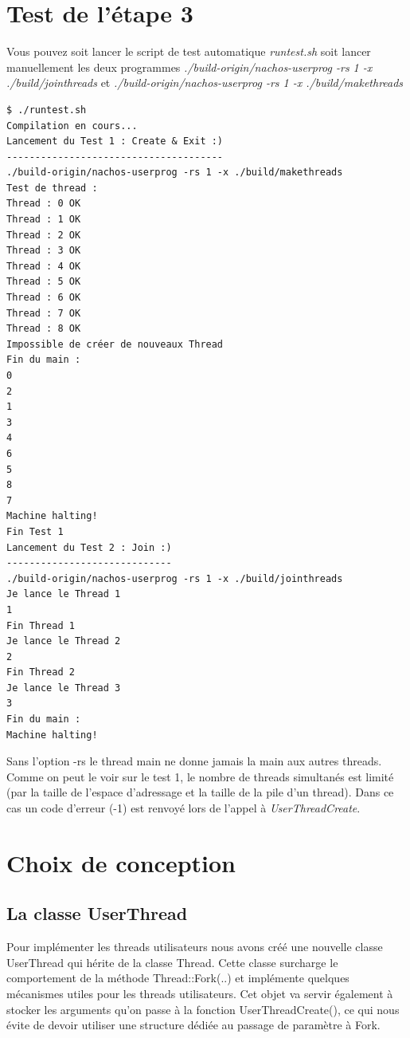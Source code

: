 \documentclass[a4paper,10pt]{article}
\begin{document}
\section{Test de l'étape 3}

Vous pouvez soit lancer le script de test automatique \textit{runtest.sh} soit
lancer manuellement les deux programmes \textit{./build-origin/nachos-userprog
-rs 1 -x ./build/jointhreads} et \textit{./build-origin/nachos-userprog -rs 1 -x
./build/makethreads}

\begin{lstlisting}
$ ./runtest.sh
Compilation en cours...
Lancement du Test 1 : Create & Exit :)
--------------------------------------
./build-origin/nachos-userprog -rs 1 -x ./build/makethreads
Test de thread :
Thread : 0 OK
Thread : 1 OK
Thread : 2 OK
Thread : 3 OK
Thread : 4 OK
Thread : 5 OK
Thread : 6 OK
Thread : 7 OK
Thread : 8 OK
Impossible de créer de nouveaux Thread
Fin du main :
0
2
1
3
4
6
5
8
7
Machine halting!
Fin Test 1
Lancement du Test 2 : Join :)
-----------------------------
./build-origin/nachos-userprog -rs 1 -x ./build/jointhreads
Je lance le Thread 1
1
Fin Thread 1
Je lance le Thread 2
2
Fin Thread 2
Je lance le Thread 3
3
Fin du main :
Machine halting!
\end{lstlisting}

Sans l'option -rs le thread main ne donne jamais la main aux autres
threads. Comme on peut le voir sur le test 1, le nombre de threads simultanés
est limité (par la taille de l'espace d'adressage et la taille de la
pile d'un thread). Dans ce cas un code d'erreur (-1) est renvoyé lors de
l'appel à \textit{UserThreadCreate}.

\section{Choix de conception}

\subsection{La classe UserThread}
Pour implémenter les threads utilisateurs nous avons créé une nouvelle classe
UserThread qui hérite de la classe Thread. Cette classe surcharge le
comportement de la méthode Thread::Fork(..) et implémente quelques mécanismes
utiles pour les threads utilisateurs. Cet objet va servir également à stocker
les arguments qu'on passe à la fonction UserThreadCreate(), ce qui nous évite
de devoir utiliser une structure dédiée au passage de paramètre à Fork.
\end{document}
